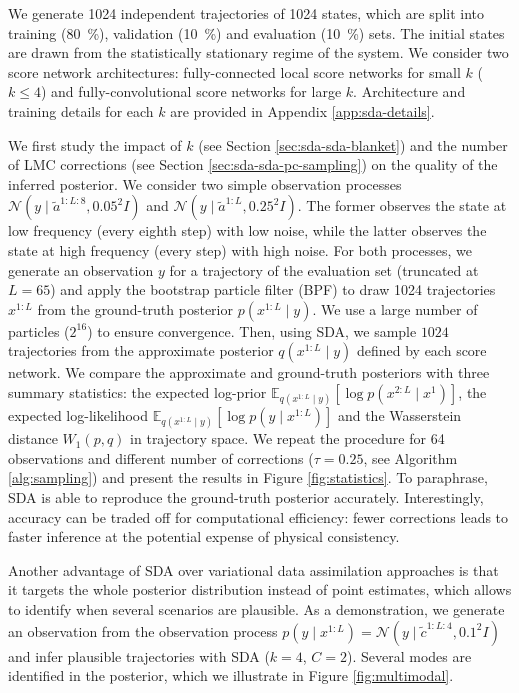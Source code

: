 We generate \num{1024} independent trajectories of \num{1024} states, which are split into training (\qty{80}{\percent}), validation (\qty{10}{\percent}) and evaluation (\qty{10}{\percent}) sets. The initial states are drawn from the statistically stationary regime of the system. We consider two score network architectures: fully-connected local score networks for small $k$ ($k \leq 4$) and fully-convolutional score networks for large $k$. Architecture and training details for each $k$ are provided in Appendix \ref{app:sda-details}.

We first study the impact of $k$ (see Section \ref{sec:sda-sda-blanket}) and the number of LMC corrections (see Section \ref{sec:sda-sda-pc-sampling}) on the quality of the inferred posterior. We consider two simple observation processes $\mathcal{N}(y \mid \tilde{a}^{1:L:8}, 0.05^2 I)$ and $\mathcal{N}(y \mid \tilde{a}^{1:L}, 0.25^2 I)$. The former observes the state at low frequency (every eighth step) with low noise, while the latter observes the state at high frequency (every step) with high noise. For both processes, we generate an observation $y$ for a trajectory of the evaluation set (truncated at $L=65$) and apply the bootstrap particle filter (BPF) to draw \num{1024} trajectories $x^{1:L}$ from the ground-truth posterior $p(x^{1:L} \mid y)$. We use a large number of particles ($2^{16}$) to ensure convergence. Then, using SDA, we sample $1024$ trajectories from the approximate posterior $q(x^{1:L} \mid y)$ defined by each score network. We compare the approximate and ground-truth posteriors with three summary statistics: the expected log-prior $\mathbb{E}_{q(x^{1:L} \mid y)} [\log p(x^{2:L} \mid x^1)]$, the expected log-likelihood $\mathbb{E}_{q(x^{1:L} \mid y)} [\log p(y\mid x^{1:L})]$ and the Wasserstein distance $W_1(p, q)$ in trajectory space. We repeat the procedure for \num{64} observations and different number of corrections ($\tau = 0.25$, see Algorithm \ref{alg:sampling}) and present the results in Figure \ref{fig:statistics}. To paraphrase, SDA is able to reproduce the ground-truth posterior accurately. Interestingly, accuracy can be traded off for computational efficiency: fewer corrections leads to faster inference at the potential expense of physical consistency.

Another advantage of SDA over variational data assimilation approaches is that it targets the whole posterior distribution instead of point estimates, which allows to identify when several scenarios are plausible. As a demonstration, we generate an observation from the observation process $p(y \mid x^{1:L}) = \mathcal{N}(y \mid \tilde{c}^{1:L:4}, 0.1^2 I)$ and infer plausible trajectories with SDA ($k=4$, $C=2$). Several modes are identified in the posterior, which we illustrate in Figure \ref{fig:multimodal}.

